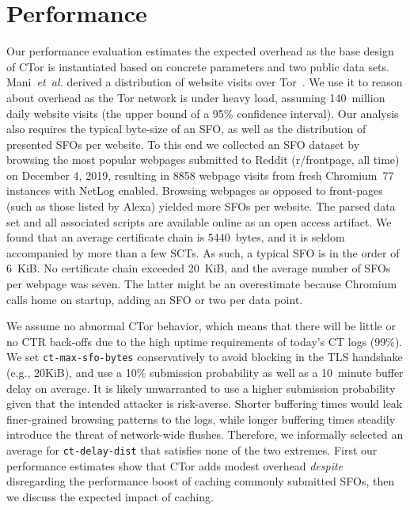 %
%
\section{Performance} \label{sec:performance}
Our performance evaluation estimates the expected overhead as the base design of
CTor is instantiated based on concrete parameters and two public data sets.
Mani~\emph{et~al.} derived a distribution of website visits over
Tor~\cite{mani}.  We use it to reason about overhead as the Tor network is under
heavy load, assuming 140~million daily website visits (the upper bound of a 95\%
confidence interval).  Our analysis also requires the typical byte-size of an
SFO, as well as the distribution of presented SFOs per website.  To this end we
collected an SFO dataset by browsing the most popular webpages submitted to
Reddit (r/frontpage, all time) on December 4, 2019, resulting in 8858 webpage
visits from fresh Chromium~77 instances with NetLog enabled.  Browsing webpages
as opposed to front-pages (such as those listed by Alexa)
yielded more SFOs per website.  The parsed data set and all associated scripts
are available online as an open access artifact.
We found that an average certificate chain is 5440~bytes, and it is seldom
accompanied by more than a few SCTs.  As such, a typical SFO is in the order of
6~KiB.  No certificate chain exceeded 20~KiB, and the average number of SFOs per
webpage was seven.  The latter might be an overestimate because Chromium 
calls home on startup, adding an SFO or two per data point.

We assume no abnormal CTor behavior, which means that there will be little or
no CTR back-offs due to the high uptime requirements of today's CT logs (99\%).
We set \texttt{ct-max-sfo-bytes} conservatively to avoid blocking in the TLS
handshake (e.g., 20KiB), and use a 10\% submission probability as well as a
10~minute buffer delay on average.  It is likely unwarranted to use a higher
submission probability given that the intended attacker is risk-averse.  Shorter
buffering times would leak finer-grained browsing patterns to the logs, while
longer buffering times steadily introduce the threat of network-wide flushes.
Therefore, we informally selected an average for \texttt{ct-delay-dist} that
satisfies none of the two extremes.
First our performance estimates show that CTor adds modest overhead
\emph{despite} disregarding the performance boost of caching commonly submitted
SFOs, then we discuss the expected impact of caching.

